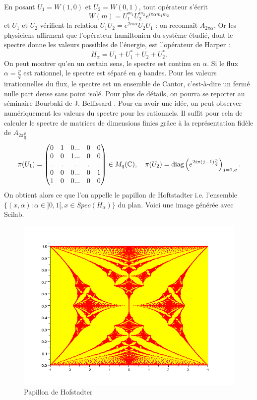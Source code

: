 En posant $U_1=W(1,0)$ et $U_2=W(0,1)$, tout opérateur s'écrit 
\[W(m)=U_1^{m_1}U_2^{m_2}e^{i\pi\alpha m_1 m_2}\]
et $U_1$ et $U_2$ vérifient la relation $U_1 U_2 = e^{2i\pi \alpha}U_2 U_1$ : on reconnaît $A_{2\pi\alpha}$. Or les physiciens affirment que l'opérateur hamiltonien du système étudié, dont le spectre donne les valeurs possibles de l'énergie, est l'opérateur de Harper :
\[H_\alpha = U_1+U_1^*+U_2+U_2^*.\]
On peut montrer qu'en un certain sens, le spectre est continu en $\alpha$. Si le flux $\alpha=\frac{p}{q}$ est rationnel, le spectre est séparé en $q$ bandes. Pour les valeurs irrationnelles du flux, le spectre est un ensemble de Cantor, c'est-à-dire un fermé nulle part dense sans point isolé. Pour plus de détails, on pourra se reporter au séminaire Bourbaki de J. Bellissard \cite{Bellissard}. Pour en avoir une idée, on peut observer numériquement les valeurs du spectre pour les rationnels. Il suffit pour cela de calculer le spectre de matrices de dimensions finies grâce à la représentation fidèle de $A_{2\pi \frac{p}{q}}$
\[\pi(U_1)=\begin{pmatrix}0 & 1 & 0 ... & 0 &0\\
0& 0 &1 ... & 0 & 0 \\
. & . & .      & . & . \\
0 & 0 & 0... & 0 & 1 \\
1 & 0 &0 ... & 0& 0 
\end{pmatrix}\in M_q(\mathbb C),\quad \pi(U_2)=\text{diag}\left(e^{2i\pi (j-1)\frac{p}{q}}\right)_{j=1,q}.\]
On obtient alors ce que l'on appelle le papillon de Hoftstadter i.e. l'ensemble $\{(x,\alpha) : \alpha \in ]0,1[, x\in Spec(H_\alpha)\}$ du plan. Voici une image générée avec Scilab.

\begin{figure}[h]\centering
\includegraphics[scale=0.6]{HofstadterRed.png}
\caption{Papillon de Hofstadter}
\label{fig:Hoftstadter}
\end{figure}